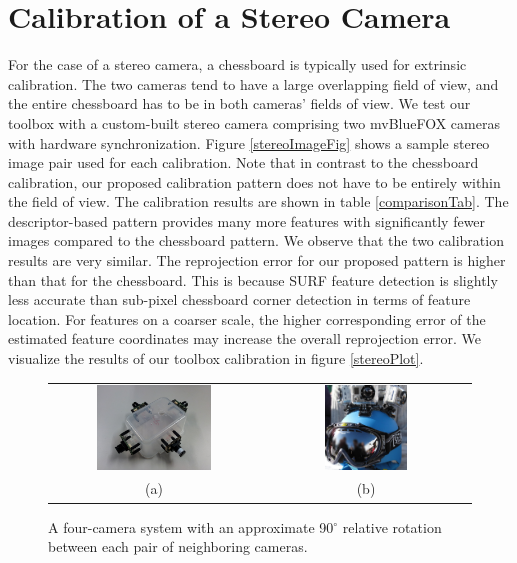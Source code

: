 \documentclass{report}
\begin{document}
\section{Calibration of a Stereo Camera}
For the case of a stereo camera, a chessboard is typically used for extrinsic calibration. The two cameras tend to have a large overlapping field of view, and the entire chessboard has to be in both cameras' fields of view. We test our toolbox with a custom-built stereo camera comprising two mvBlueFOX cameras with hardware synchronization. Figure \ref{stereoImageFig} shows a sample stereo image pair used for each calibration. Note that in contrast to the chessboard calibration, our proposed calibration pattern does not have to be entirely within the field of view. The calibration results are shown in table \ref{comparisonTab}. The descriptor-based pattern provides many more features with significantly fewer images compared to the chessboard pattern. We observe that the two calibration results are very similar. The reprojection error for our proposed pattern is higher than that for the chessboard. This is because SURF feature detection is slightly less accurate than sub-pixel chessboard corner detection in terms of feature location. For features on a coarser scale, the higher corresponding error of the estimated feature coordinates may increase the overall reprojection error. We visualize the results of our toolbox calibration in figure \ref{stereoPlot}.

\setlength{\tabcolsep}{2pt}
\begin{figure}
\centering
\begin{tabular}{cc}
\includegraphics[width=0.574\textwidth]{images/fourcamerarig}&
\includegraphics[width=0.416\textwidth]{images/helmet} \\
(a) & (b)
\end{tabular}
\caption{A four-camera system with an approximate 90\ensuremath{^\circ} relative rotation between each pair of neighboring cameras.}
\label{cameraRigPhoto}
\end{figure}
\end{document}
